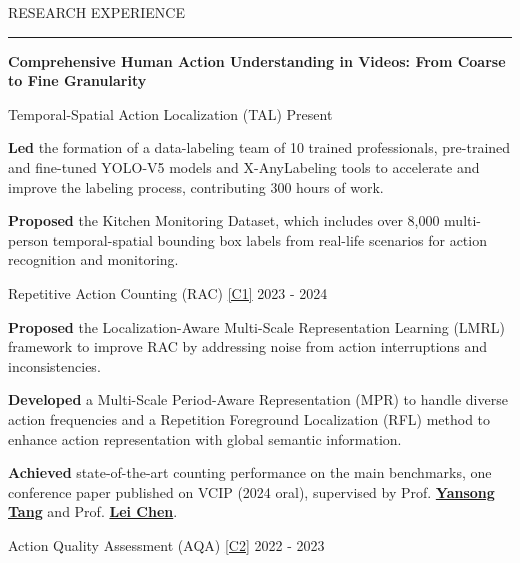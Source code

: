 \documentclass{resume} %
\renewenvironment{rSection}[1]{
\sectionskip
\textcolor{TsinghuaPurple}{\MakeUppercase{#1}}
\sectionlineskip
\hrule
\begin{list}{}{
\setlength{\leftmargin}{0em}
}
\item[]
}{
\end{list}
}
\begin{document}
\begin{rSection}{RESEARCH EXPERIENCE}
\vspace{5pt}
\textbf{\large{\textcolor{darkpurple}{Comprehensive Human Action Understanding in Videos: From Coarse to Fine Granularity}}}\vspace{5pt}\\
\begin{rSubsection}{Temporal-Spatial Action Localization (TAL)} {Present}{}{}
    \item \textbf{Led} the formation of a data-labeling team of 10 trained professionals, pre-trained and fine-tuned YOLO-V5 models and X-AnyLabeling tools to accelerate and improve the labeling process, contributing 300 hours of work.
    \item \textbf{Proposed} the Kitchen Monitoring Dataset, which includes over 8,000 multi-person temporal-spatial bounding box labels from real-life scenarios for action recognition and monitoring.
\end{rSubsection}\vspace{-8pt}
\begin{rSubsection}{Repetitive Action Counting (RAC) \hyperref[c2]{[C1]}} {2023 - 2024}{}{}
    \item  \textbf{Proposed} the Localization-Aware Multi-Scale Representation Learning (LMRL) framework to improve RAC by addressing noise from action interruptions and inconsistencies.
    \item \textbf{Developed} a Multi-Scale Period-Aware Representation (MPR) to handle diverse action frequencies and a Repetition Foreground Localization (RFL) method to enhance action representation with global semantic information.
    \item \textbf{Achieved} state-of-the-art counting performance on the main benchmarks, one conference paper published on VCIP (2024 oral), supervised by Prof. \href{https://andytang15.github.io/}{\textbf{Yansong Tang}} and Prof. \href{https://leichenthu.github.io/}{\textbf{Lei Chen}}.
\end{rSubsection}\vspace{-8pt}
\begin{rSubsection}{Action Quality Assessment (AQA)  \hyperref[c2]{[C2]}} {2022 - 2023}{}{}

\end{rSubsection}
\end{rSection}
\end{document}
